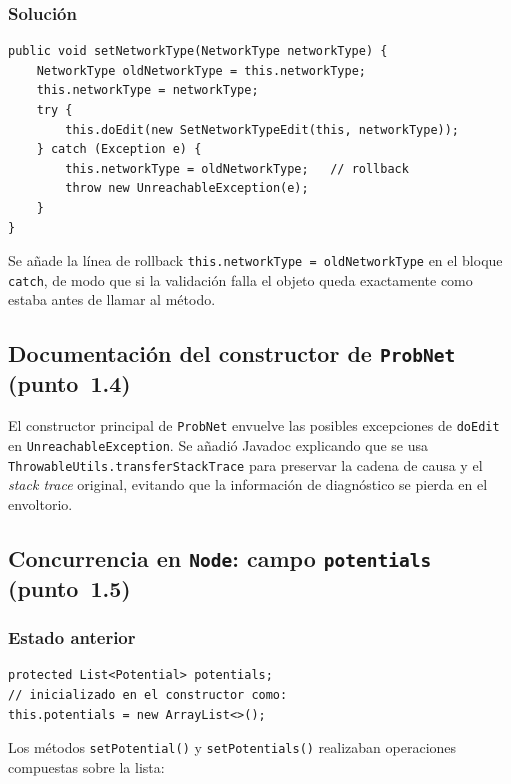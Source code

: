 \documentclass[11pt,a4paper]{article}
\newcommand{\code}[1]{\texttt{#1}}
\begin{document}
\subsubsection*{Solución}

\begin{lstlisting}
public void setNetworkType(NetworkType networkType) {
    NetworkType oldNetworkType = this.networkType;
    this.networkType = networkType;
    try {
        this.doEdit(new SetNetworkTypeEdit(this, networkType));
    } catch (Exception e) {
        this.networkType = oldNetworkType;   // rollback
        throw new UnreachableException(e);
    }
}
\end{lstlisting}

Se añade la línea de rollback \code{this.networkType = oldNetworkType} en
el bloque \code{catch}, de modo que si la validación falla el objeto queda
exactamente como estaba antes de llamar al método.

\subsection{Documentación del constructor de \code{ProbNet} (punto~1.4)}

El constructor principal de \code{ProbNet} envuelve las posibles excepciones
de \code{doEdit} en \code{UnreachableException}. Se añadió Javadoc explicando
que se usa \code{ThrowableUtils.transferStackTrace} para preservar la cadena
de causa y el \emph{stack trace} original, evitando que la información de
diagnóstico se pierda en el envoltorio.

\subsection{Concurrencia en \code{Node}: campo \code{potentials}
            (punto~1.5)}

\subsubsection*{Estado anterior}

\begin{lstlisting}
protected List<Potential> potentials;
// inicializado en el constructor como:
this.potentials = new ArrayList<>();
\end{lstlisting}

Los métodos \code{setPotential()} y \code{setPotentials()} realizaban
operaciones compuestas sobre la lista:
\end{document}
